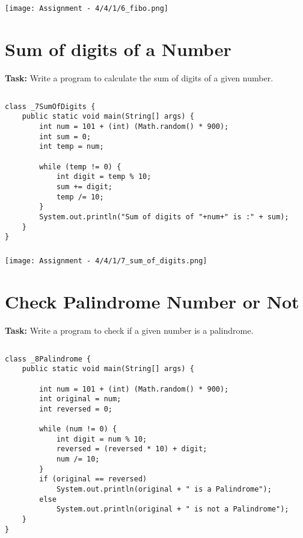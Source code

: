\documentclass[12pt,a4paper]{article}
\begin{document}
\subsubsection{}
\begin{center}
    \texttt{[image: Assignment - 4/4/1/6\_fibo.png]}
\end{center}

\section{Sum of digits of a Number}
\textbf{Task:} Write a program to calculate the sum of digits of a given number.

\subsection{}
\begin{lstlisting}
class _7SumOfDigits {
    public static void main(String[] args) {
        int num = 101 + (int) (Math.random() * 900);
        int sum = 0;
        int temp = num;
        
        while (temp != 0) {
            int digit = temp % 10;
            sum += digit;
            temp /= 10;
        }
        System.out.println("Sum of digits of "+num+" is :" + sum);
    }
}
\end{lstlisting}

\subsubsection{}
\begin{center}
    \texttt{[image: Assignment - 4/4/1/7\_sum\_of\_digits.png]}
\end{center}

\section{Check Palindrome Number or Not}
\textbf{Task:} Write a program to check if a given number is a palindrome.

\subsection{}
\begin{lstlisting}
class _8Palindrome {
    public static void main(String[] args) {
    
        int num = 101 + (int) (Math.random() * 900);
        int original = num;
        int reversed = 0;
    
        while (num != 0) {
            int digit = num % 10;
            reversed = (reversed * 10) + digit;
            num /= 10;
        }
        if (original == reversed) 
            System.out.println(original + " is a Palindrome");
        else 
            System.out.println(original + " is not a Palindrome");
    }
}
\end{lstlisting}
\end{document}
